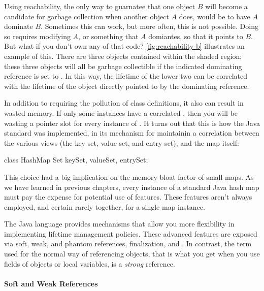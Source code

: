 Using reachability, the only way to guarnatee that one object
$B$ will become a candidate for garbage collection when another object $A$ does,
would be to have $A$ dominate $B$. Sometimes this can work, but more often,
this is not possible. Doing so requires modifying $A$, or something that $A$
domiantes, so that it points to $B$. But what if you don't own any of that code?
\autoref{fig:reachability-b} illustrates an example of this. There are three
objects contained within the shaded region; these three objects will all be garbage collectible if
the indicated dominating reference is set to . In this way, the
lifetime of the lower two can be correlated with the lifetime of the object
directly pointed to by the dominating reference.

In addition to requiring the pollution of class definitions, it also can result
in wasted memory. If only some  instances have a correlated ,
then you will be wasting a pointer slot for every instance of . It turns
out that this is how the Java standard  was implemented, in its
mechanism for maintainin a correlation between the various views (the key set,
value set, and entry set), and the map itself:
\begin{shortlisting}
class HashMap {
   Set keySet, valueSet, entrySet;
}
\end{shortlisting}
This choice had a big implication on the memory bloat factor of small maps. As
we have learned in previous chapters, every instance of a standard Java hash map
must pay the expense for potential use of features. These features aren't
always employed, and certain rarely together, for a single map instance.

The Java language provides mechanisms that allow you more flexibility in
implementing lifetime management policies. These advanced features are exposed
via soft, weak, and phantom references, finalization, and \tls.
In contrast, the term used for 
the
normal way of referencing objects, that is what you get when you use fields of
objects or local variables, is a \emph{strong}
reference.

\paragraph{Soft and Weak References}


